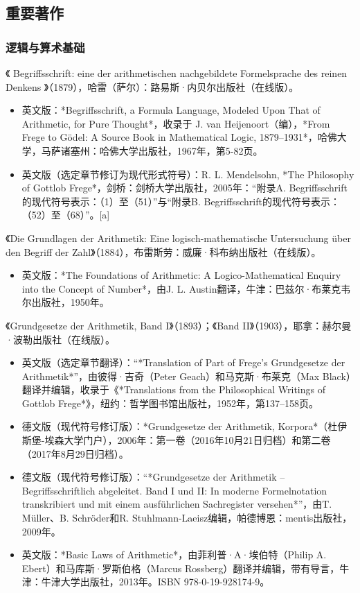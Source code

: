 \subsection{重要著作}  
\subsubsection{逻辑与算术基础} 
《 Begriffsschrift: eine der arithmetischen nachgebildete Formelsprache des reinen Denkens 》（1879），哈雷（萨尔）：路易斯·内贝尔出版社（在线版）。
\begin{itemize}
\item 英文版：*Begriffsschrift, a Formula Language, Modeled Upon That of Arithmetic, for Pure Thought*，收录于 J. van Heijenoort（编），*From Frege to Gödel: A Source Book in Mathematical Logic, 1879–1931*，哈佛大学，马萨诸塞州：哈佛大学出版社，1967年，第5-82页。  
\item 英文版（选定章节修订为现代形式符号）：R. L. Mendelsohn, *The Philosophy of Gottlob Frege*，剑桥：剑桥大学出版社，2005年：“附录A. Begriffsschrift的现代符号表示：（1）至（51）”与“附录B. Begriffsschrift的现代符号表示：（52）至（68）”。[a]
\end{itemize}
《Die Grundlagen der Arithmetik: Eine logisch-mathematische Untersuchung über den Begriff der Zahl》（1884），布雷斯劳：威廉·科布纳出版社（在线版）。
\begin{itemize}
\item 英文版：*The Foundations of Arithmetic: A Logico-Mathematical Enquiry into the Concept of Number*，由J. L. Austin翻译，牛津：巴兹尔·布莱克韦尔出版社，1950年。
\end{itemize}
《Grundgesetze der Arithmetik, Band I》（1893）；《Band II》（1903），耶拿：赫尔曼·波勒出版社（在线版）。
\begin{itemize}
\item 英文版（选定章节翻译）：“*Translation of Part of Frege's Grundgesetze der Arithmetik*”，由彼得·吉奇（Peter Geach）和马克斯·布莱克（Max Black）翻译并编辑，收录于《*Translations from the Philosophical Writings of Gottlob Frege*》，纽约：哲学图书馆出版社，1952年，第137–158页。  
\item 德文版（现代符号修订版）：*Grundgesetze der Arithmetik, Korpora*（杜伊斯堡-埃森大学门户），2006年：第一卷（2016年10月21日归档）和第二卷（2017年8月29日归档）。  
\item 德文版（现代符号修订版）：“*Grundgesetze der Arithmetik – Begriffsschriftlich abgeleitet. Band I und II: In moderne Formelnotation transkribiert und mit einem ausführlichen Sachregister versehen*”，由T. Müller、B. Schröder和R. Stuhlmann-Laeisz编辑，帕德博恩：mentis出版社，2009年。  
\item 英文版：*Basic Laws of Arithmetic*，由菲利普·A·埃伯特（Philip A. Ebert）和马库斯·罗斯伯格（Marcus Rossberg）翻译并编辑，带有导言，牛津：牛津大学出版社，2013年。ISBN 978-0-19-928174-9。
\end{itemize}
